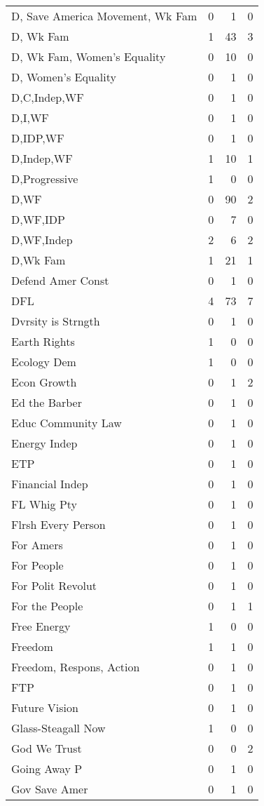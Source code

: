 \begin{supertabular}{lrrr}
D, Save America Movement, Wk Fam & 0 & 1 & 0\\
D, Wk Fam & 1 & 43 & 3\\
D, Wk Fam, Women's Equality & 0 & 10 & 0\\
D, Women's Equality & 0 & 1 & 0\\
D,C,Indep,WF & 0 & 1 & 0\\
D,I,WF & 0 & 1 & 0\\
D,IDP,WF & 0 & 1 & 0\\
D,Indep,WF & 1 & 10 & 1\\
D,Progressive & 1 & 0 & 0\\
D,WF & 0 & 90 & 2\\
D,WF,IDP & 0 & 7 & 0\\
D,WF,Indep & 2 & 6 & 2\\
D,Wk Fam & 1 & 21 & 1\\
Defend Amer Const & 0 & 1 & 0\\
DFL & 4 & 73 & 7\\
Dvrsity is Strngth & 0 & 1 & 0\\
Earth Rights & 1 & 0 & 0\\
Ecology Dem & 1 & 0 & 0\\
Econ Growth & 0 & 1 & 2\\
Ed the Barber & 0 & 1 & 0\\
Educ Community Law & 0 & 1 & 0\\
Energy Indep & 0 & 1 & 0\\
ETP & 0 & 1 & 0\\
Financial Indep & 0 & 1 & 0\\
FL Whig Pty & 0 & 1 & 0\\
Flrsh Every Person & 0 & 1 & 0\\
For Amers & 0 & 1 & 0\\
For People & 0 & 1 & 0\\
For Polit Revolut & 0 & 1 & 0\\
For the People & 0 & 1 & 1\\
Free Energy & 1 & 0 & 0\\
Freedom & 1 & 1 & 0\\
Freedom, Respons, Action & 0 & 1 & 0\\
FTP & 0 & 1 & 0\\
Future Vision & 0 & 1 & 0\\
Glass-Steagall Now & 1 & 0 & 0\\
God We Trust & 0 & 0 & 2\\
Going Away P & 0 & 1 & 0\\
Gov Save Amer & 0 & 1 & 0\\

\end{supertabular}
